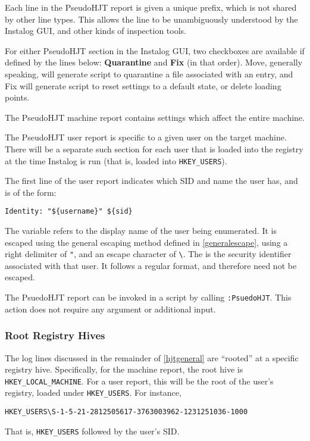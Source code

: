 Each line in the PseudoHJT report is given a unique prefix, which is not shared
by other line types. This allows the line to be unambiguously understood by the
Instalog GUI, and other kinds of inspection tools.

For either PseudoHJT section in the Instalog GUI, two checkboxes are available
if defined by the lines below: \textbf{Quarantine} and \textbf{Fix} (in that
order).  Move, generally speaking, will generate script to quarantine a file
associated with an entry, and Fix will generate script to reset settings to a
default state, or delete loading points.

The PseudoHJT machine report contains settings which affect the entire machine.

The PseudoHJT user report is specific to a given user on the target machine.
There will be a separate such section for each user that is loaded into the
registry at the time Instalog is run (that is, loaded into \verb|HKEY_USERS|).

The first line of the user report indicates which SID and name the user has, and
is of the form:
\begin{verbatim}
Identity: "${username}" ${sid}
\end{verbatim}

The variable  refers to the display name of the user being
enumerated. It is escaped using the general escaping method defined in
\ref{generalescape}, using a right delimiter of \verb|"|, and an escape
character of \verb|\|. The  is the security identifier associated with
that user. It follows a regular format, and therefore need not be escaped.

The PsuedoHJT report  can be invoked in a script by calling \verb|:PsuedoHJT|. 
This action does not require any argument or additional input.

\subsubsection{Root Registry Hives}
The log lines discussed in the remainder of \ref{hjtgeneral} are ``rooted'' at a
specific registry hive. Specifically, for the machine report, the root hive is
\verb|HKEY_LOCAL_MACHINE|. For a user report, this will be the root of the
user's registry, loaded under \verb|HKEY_USERS|. For instance,
\begin{verbatim}
HKEY_USERS\S-1-5-21-2812505617-3763003962-1231251036-1000
\end{verbatim}
That is, \verb|HKEY_USERS| followed by the user's SID.

